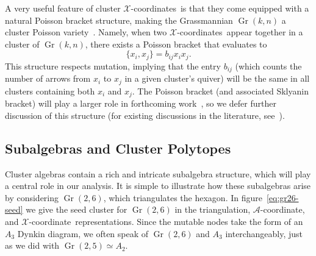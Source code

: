 \documentclass[12pt]{article}
\DeclareMathOperator{\Gr}{Gr}
\def\xcoord{$\mathcal{X}$-coordinate}
\def\xcoords{$\mathcal{X}$-coordinates}
\def\acoord{$\mathcal{A}$-coordinate}
\begin{document}
A very useful feature of cluster \xcoords\ is that they come equipped with a natural Poisson bracket structure, making the Grassmannian $\Gr(k,n)$ a cluster Poisson variety~\cite{GSV}. Namely, when two \xcoords\ appear together in a cluster of $\Gr(k,n)$, there exists a Poisson bracket that evaluates to
\begin{equation}
\{x_i, x_j \} = b_{ij} x_i x_j .
\end{equation}
This structure respects mutation, implying that the entry $b_{ij}$ (which counts the number of arrows from $x_i$ to $x_j$ in a given cluster's quiver) will be the same in all clusters containing both $x_i$ and $x_j$. The Poisson bracket (and associated Sklyanin bracket) will play a larger role in forthcoming work~\cite{cluster_subalgebras_ii}, so we defer further discussion of this structure (for existing discussions in the literature, see~\cite{PoissonVarieties,Vergu:2015svm}).

\subsection{Subalgebras and Cluster Polytopes}\label{sec:subalgebras_cluster_polytopes}

Cluster algebras contain a rich and intricate subalgebra structure, which will play a central role in our analysis. It is simple to illustrate how these subalgebras arise by considering $\Gr(2,6)$, which triangulates the hexagon. In figure~\ref{eq:gr26-seed} we give the seed cluster for $\Gr(2,6)$ in the triangulation, \acoord, and \xcoord\ representations. Since the mutable nodes take the form of an $A_3$ Dynkin diagram, we often speak of $\Gr(2,6)$ and $A_3$ interchangeably, just as we did with $\Gr(2,5) \simeq A_2$. 
\end{document}
